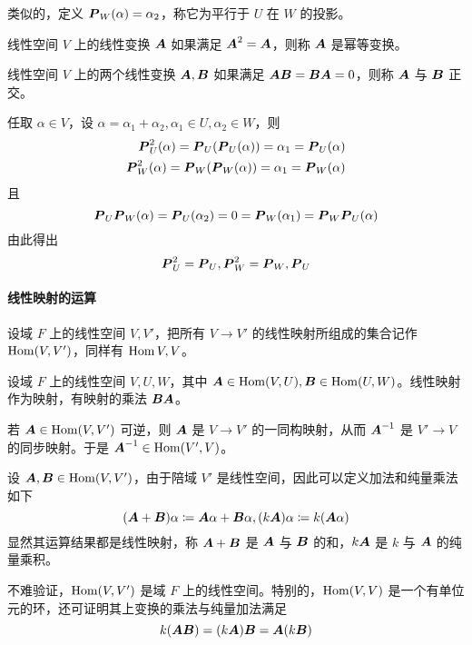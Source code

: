 类似的，定义 $\bfP_W(\alpha) = \alpha_2$，称它为平行于 $U$ 在 $W$ 的投影。

\begin{definition}[幂等变换]
    线性空间 $V$ 上的线性变换 $\bfA$ 如果满足 $\bfA^2 = \bfA$，则称 $\bfA$ 是幂等变换。
\end{definition}

\begin{definition}
    线性空间 $V$ 上的两个线性变换 $\bfA, \bfB$ 如果满足 $\bfA\bfB = \bfB\bfA = 0$，则称 $\bfA$ 与 $\bfB$ 正交。
\end{definition}

任取 $\alpha\in V$，设 $\alpha = \alpha_1 + \alpha_2, \alpha_1 \in U, \alpha_2 \in W$，则
\begin{equation*}
    \begin{aligned}
        \bfP_U^2(\alpha) = \bfP_U(\bfP_U(\alpha)) = \alpha_1 = \bfP_U(\alpha)\\
        \bfP_W^2(\alpha) = \bfP_W(\bfP_W(\alpha)) = \alpha_1 = \bfP_W(\alpha)
    \end{aligned}
\end{equation*}
且
\[ \bfP_U\bfP_W(\alpha) = \bfP_U(\alpha_2) = 0 = \bfP_W(\alpha_1) = \bfP_W\bfP_U(\alpha) \]
由此得出
\[ \bfP_U^2 = \bfP_U, \bfP_W^2 = \bfP_W, \bfP_U \]

\paragraph{线性映射的运算}

设域 $F$ 上的线性空间 $V,V'$，把所有 $V \to V'$ 的线性映射所组成的集合记作 $\Hom(V,V')$，同样有 $\Hom{V,V}$。

设域 $F$ 上的线性空间 $V,U,W$，其中 $\bfA \in \Hom(V,U), \bfB \in \Hom(U,W)$。线性映射作为映射，有映射的乘法 $\bfB\bfA$。

若 $\bfA\in \Hom(V,V')$ 可逆，则 $\bfA$ 是 $V \to V'$ 的一同构映射，从而 $\bfA^{-1}$ 是 $V' \to V$ 的同步映射。于是 $\bfA^{-1} \in \Hom(V',V)$。

设 $\bfA,\bfB \in \Hom (V,V')$，由于陪域 $V'$ 是线性空间，因此可以定义加法和纯量乘法如下
\[ (\bfA + \bfB) \alpha \coloneqq \bfA\alpha + \bfB\alpha, (k\bfA)\alpha \coloneqq k(\bfA \alpha) \]
显然其运算结果都是线性映射，称 $\bfA + \bfB$ 是 $\bfA$ 与 $\bfB$ 的和，$k\bfA$ 是 $k$ 与 $\bfA$ 的纯量乘积。

不难验证，$\Hom(V,V')$ 是域 $F$ 上的线性空间。特别的，$\Hom(V,V)$ 是一个有单位元的环，还可证明其上变换的乘法与纯量加法满足
\[ k(\bfA\bfB) = (k\bfA)\bfB = \bfA(k\bfB) \]

